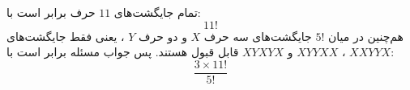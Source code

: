         \p
تمام جایگشت‌های
$11$
حرف برابر است با:
$$11!$$
هم‌چنین در میان
$5!$
جایگشت‌های سه حرف
$X$
و دو حرف
$Y$
، یعنی فقط جایگشت‌های
$XXYYX$
،
$XYYXX$
و
$XYXYX$
قابل قبول هستند. پس جواب مسئله برابر است با:
$$\frac{3\times 11!}{5!}$$